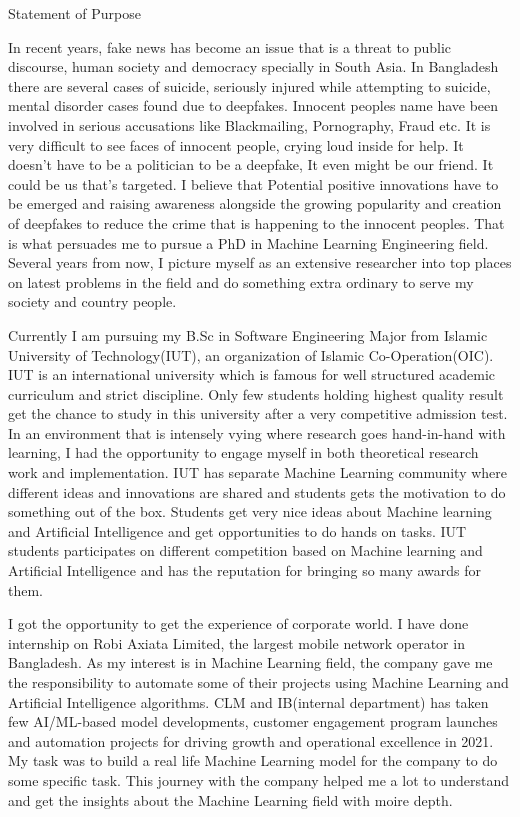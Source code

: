 \documentclass[11pt, a4paper]{article}
\begin{document}
\begin{center} 
\large{Statement of Purpose} 
\end{center} 

\noindent In recent years, fake news has become an issue that is a threat to public discourse, human society and democracy specially in South Asia. In Bangladesh there are several cases of suicide, seriously injured while attempting to suicide, mental disorder cases found due to deepfakes. Innocent peoples name have been involved in serious accusations like  Blackmailing, Pornography, Fraud etc. It is very difficult to see faces of innocent people, crying loud inside for help. It doesn't have to be a politician to be a deepfake, It even might be our friend. It could be us that’s targeted. I believe that Potential positive innovations have to be emerged and raising awareness alongside the growing popularity and creation of deepfakes to reduce the crime that is happening to the innocent peoples. That is what persuades me to pursue a PhD in Machine Learning Engineering field. Several years from now, I picture myself as an extensive researcher into top places on latest problems in the field and do something extra ordinary to serve my society and country people. \vspace{.5cm}

\noindent Currently I am pursuing my B.Sc in Software Engineering Major from Islamic University of Technology(IUT), an organization of Islamic Co-Operation(OIC). IUT is an  international university which is famous for well structured academic curriculum and strict discipline. Only few students holding highest quality result get the chance to study in this university after a very competitive admission test. In an environment that is intensely vying where research goes hand-in-hand with learning, I had the opportunity to engage myself in both theoretical research work and implementation. IUT has separate Machine Learning community where different ideas and innovations are shared and students gets the motivation to do something out of the box. Students get very nice ideas about Machine learning and Artificial Intelligence and get opportunities to do hands on tasks. IUT students participates on different competition based on Machine learning and Artificial Intelligence and has the reputation for bringing so many awards for them.\vspace{.5cm}

\noindent I got the opportunity to get the experience of corporate world. I have done internship on Robi Axiata Limited, the largest mobile network operator in Bangladesh. As my interest is in Machine Learning field, the company gave me the responsibility to automate some of their projects using Machine Learning and Artificial Intelligence algorithms. CLM and IB(internal department) has taken few AI/ML-based model developments, customer engagement program launches and automation projects for driving growth and operational excellence in 2021. My task was to build a real life Machine Learning model for the company to do some specific task. This journey with the company helped me a lot to understand and get the insights about the Machine Learning field with moire depth.\vspace{.5cm}
\end{document}
